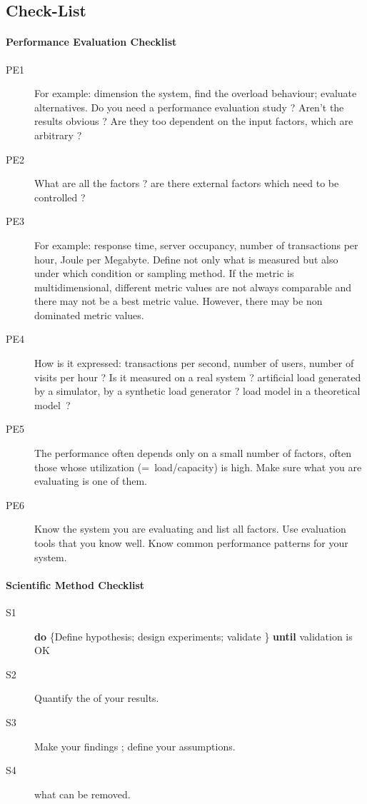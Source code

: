 \subsection{Check-List}
\paragraph{Performance Evaluation Checklist}
 \begin{description}
  \item[PE1]  For example: dimension the system, find the overload
  behaviour; evaluate alternatives. Do you need a performance evaluation study  ? Aren't the results obvious ?
Are they too dependent on the input factors, which are arbitrary ?
  \item[PE2] 
  What are all the factors ? are there external factors which need to be controlled ?
  \item[PE3] 
  For example: response time, server occupancy, number of
  transactions per hour, Joule per
  Megabyte. Define not only what is measured but also under which condition
  or sampling method. If the metric is multidimensional, different
  metric values are not always comparable and there may not be
  a best metric value. However, there may be non dominated
  metric values.
  \item[PE4]  How is it expressed: transactions per second, number of users, number of visits per hour ? Is it measured on a real system ? artificial load generated by a simulator, by a synthetic load
  generator ? load model in a theoretical model~?
  \item[PE5]  The performance often depends only on a small
  number of factors, often those whose utilization (=~load/capacity) is high. Make sure what you are evaluating is one of them.
  \item [PE6] 
  Know the system you are evaluating and list all factors.
  Use evaluation tools that you know well. Know
  common performance patterns for your system.
\end{description}
\paragraph{Scientific Method Checklist}
\begin{description}
  \item[S1]  \newline
  \textbf{do} \{Define hypothesis; design experiments; validate \}
   \textbf{until} validation is OK
  \item[S2] Quantify the  of your results.
  \item[S3] Make your findings ; define your assumptions.
  \item[S4]  what can be removed.
\end{description}

